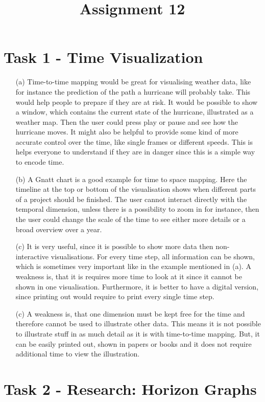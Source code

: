 \documentclass[a4paper]{article}
\date{}
\author{}
\title{\textbf{Assignment 12}}
\begin{document}
\maketitle 
\thispagestyle{fancy}

\section*{Task 1 - Time Visualization}
\begin{enumerate}
	\item[(a)] Time-to-time mapping would be great for visualising weather data, like for instance the prediction of the path a hurricane will probably take. 
	This would help people to prepare if they are at risk. 
	It would be possible to show a window, which contains the current state of the hurricane, illustrated as a weather map. 
	Then the user could press play or pause and see how the hurricane moves. 
	It might also be helpful to provide some kind of more accurate control over the time, like single frames or different speeds. 
	This is helps everyone to understand if they are in danger since this is a simple way to encode time. 
	\item[(b)] A Gnatt chart is a good example for time to space mapping. 
	Here the timeline at the top or bottom of the visualisation shows when different parts of a project should be finished. 
	The user cannot interact directly with the temporal dimension, unless there is a possibility to zoom in for instance, then the user could change the scale of the time to see either more details or a broad overview over a year. 
	\item[(c)] It is very useful, since it is possible to show more data then non-interactive visualisations. 
	For every time step, all information can be shown, which is sometimes very important like in the example mentioned in (a). 
	A weakness is, that it is requires more time to look at it since it cannot be shown in one visualisation. 
	Furthermore, it is better to have a digital version, since printing out would require to print every single time step. 
	\item[(c)] A weakness is, that one dimension must be kept free for the time and therefore cannot be used to illustrate other data. 
	This means it is not possible to illustrate stuff in as much detail as it is with time-to-time mapping. 
	But, it can be easily printed out, shown in papers or books and it does not require additional time to view the illustration. 
\end{enumerate}

\section*{Task 2 - Research: Horizon Graphs}
\end{document}
